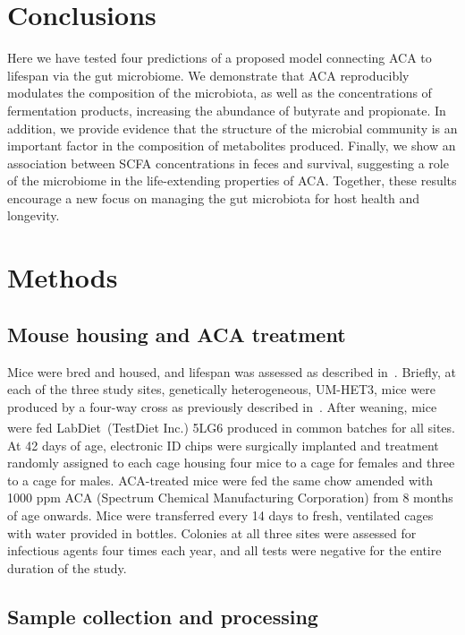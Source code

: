 \documentclass{doc/template/bmcart-nofigbox}
\begin{document}
\section*{Conclusions}

Here we have tested four predictions of a proposed model connecting
ACA to lifespan via the gut microbiome.
We demonstrate that ACA reproducibly modulates the composition
of the microbiota, as well as the concentrations of fermentation products,
increasing the abundance of butyrate and propionate.
In addition, we provide evidence that the structure of the microbial
community is an important factor in the composition of metabolites produced.
Finally, we show an association between SCFA concentrations in feces and
survival, suggesting a role of the microbiome in the life-extending properties
of ACA\@.
Together, these results encourage a new focus on managing the gut microbiota
for host health and longevity.

\section*{Methods}

\subsection*{Mouse housing and ACA treatment}

Mice were bred and housed, and lifespan was assessed as described in~\cite{Harrison2014}.
Briefly, at each of the three study sites, genetically heterogeneous, UM-HET3,
mice were produced by a four-way cross as previously described in~\cite{Miller2011}.
After weaning, mice were fed LabDiet\textsuperscript{\textregistered}~(TestDiet Inc.)
5LG6 produced in
common batches for all sites.
At 42 days of age, electronic ID chips were surgically implanted and treatment
randomly assigned to each cage housing four mice to a cage for females
and three to a cage for males.
ACA-treated mice were fed the same chow amended with 1000 ppm ACA
(Spectrum Chemical Manufacturing Corporation) from 8 months of age onwards.
Mice were transferred every 14 days to fresh, ventilated cages with
water provided in bottles.
Colonies at all three sites were assessed for infectious agents four
times each year, and all tests were negative for the entire duration of the
study.

\subsection*{Sample collection and processing}
\end{document}
